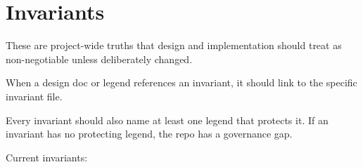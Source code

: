 \chapter{Invariants}\label{record-029}

\smallskip

These are project-wide truths that design and implementation should treat as non-negotiable unless deliberately changed.

When a design doc or legend references an invariant, it should link to the specific invariant file.

Every invariant should also name at least one legend that protects it. If an invariant has no protecting legend, the repo has a governance gap.

Current invariants:

